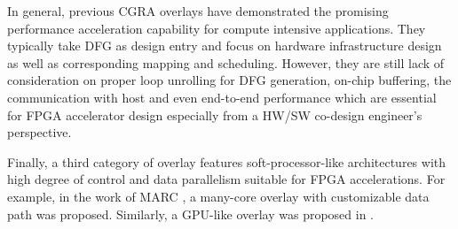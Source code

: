 In general, previous CGRA overlays have demonstrated the promising performance acceleration capability for compute intensive applications. They typically take DFG as design entry and focus on hardware infrastructure design as well as corresponding mapping and scheduling. However, they are still lack of consideration on proper loop unrolling for DFG generation, on-chip buffering, the communication with host and even end-to-end performance which are essential for FPGA accelerator design especially from a HW/SW co-design engineer's perspective.




Finally, a third category of overlay features soft-processor-like architectures with high degree of control and data parallelism suitable for FPGA accelerations.  For example, in the work of MARC \cite{Lebedev2010}, a many-core overlay with customizable data path was proposed.  Similarly, a GPU-like overlay was proposed in \cite{Jeffrey2011potential}.

